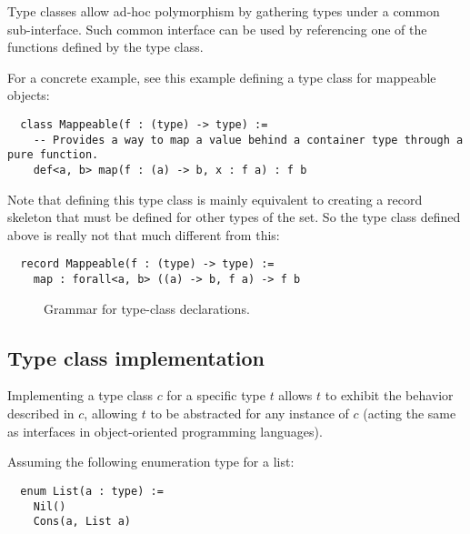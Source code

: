 Type classes allow ad-hoc polymorphism by gathering types under a common sub-interface.
Such common interface can be used by referencing one of the functions defined by the type class.

For a concrete example, see this example defining a type class for mappeable objects:

\noindent\begin{verbatim}
  class Mappeable(f : (type) -> type) :=
    -- Provides a way to map a value behind a container type through a pure function.
    def<a, b> map(f : (a) -> b, x : f a) : f b
\end{verbatim}
\vspace*{\baselineskip}

Note that defining this type class is mainly equivalent to creating a record skeleton that must be defined for other types of the set.
So the type class defined above is really not that much different from this:

\noindent\begin{verbatim}
  record Mappeable(f : (type) -> type) :=
    map : forall<a, b> ((a) -> b, f a) -> f b
\end{verbatim}

\begin{figure}[H]
  \centering


  \caption{Grammar for type-class declarations.}
  \label{fig:zilch-grammar-declarations-typeclass-grammar}
\end{figure}

\subsection{Type class implementation}\label{subsec:zilch-grammar-declarations-implementation}

Implementing a type class $c$ for a specific type $t$ allows $t$ to exhibit the behavior described in $c$, allowing $t$ to be abstracted for any instance of $c$ (acting the same as interfaces in object-oriented programming languages).

Assuming the following enumeration type for a list:

\noindent\begin{verbatim}
  enum List(a : type) :=
    Nil()
    Cons(a, List a)
\end{verbatim}
\vspace*{\baselineskip}

